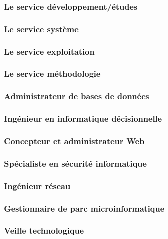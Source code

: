 \documentclass[10pt,a4paper,oneside,titlepage]{report}
\begin{document}
\begin{sffamily}
\subsubsection{Le service développement/études}

\subsubsection{Le service système}

\subsubsection{Le service exploitation}

\subsubsection{Le service méthodologie}

\subsubsection{Administrateur de bases de données}

\subsubsection{Ingénieur en informatique décisionnelle}

\subsubsection{Concepteur et administrateur Web}

\subsubsection{Spécialiste en sécurité informatique}

\subsubsection{Ingénieur réseau}

\subsubsection{Gestionnaire de parc microinformatique}

\subsubsection{Veille technologique}


\end{sffamily}
\end{document}
